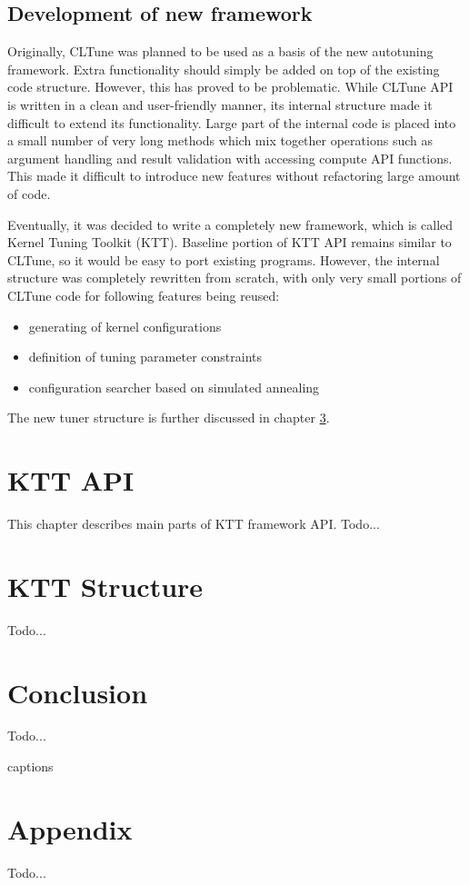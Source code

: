 \documentclass
[
    digital, %
    oneside, %
    table, %
    nolof, %
    nolot, %
    nocover %
]{fithesis3}
\begin{document}
\section{Development of new framework}
Originally, CLTune was planned to be used as a basis of the new autotuning framework. Extra functionality should simply be added on top of the
existing code structure. However, this has proved to be problematic. While CLTune API is written in a clean and user-friendly manner, its
internal structure made it difficult to extend its functionality. Large part of the internal code is placed into a small number of very long methods
which mix together operations such as argument handling and result validation with accessing compute API functions. This made it difficult to
introduce new features without refactoring large amount of code.

Eventually, it was decided to write a completely new framework, which is called Kernel Tuning Toolkit (KTT). Baseline portion of KTT API remains
similar to CLTune, so it would be easy to port existing programs. However, the internal structure was completely rewritten from scratch, with only
very small portions of CLTune code for following features being reused:
\begin{itemize}
    \item generating of kernel configurations
    \item definition of tuning parameter constraints
    \item configuration searcher based on simulated annealing
\end{itemize}
The new tuner structure is further discussed in chapter \ref{ktt-structure}.

\chapter{KTT API}
\label{ktt-api}
This chapter describes main parts of KTT framework API. Todo...

\chapter{KTT Structure}
\label{ktt-structure}
Todo...

\chapter{Conclusion}
Todo...

\csname captions\languagename\endcsname
\makeatletter
\thesis@selectLocale{\thesis@locale}\makeatother
\printbibliography[heading=bibintoc]

\appendix
\chapter{Appendix}
Todo...
\end{document}
